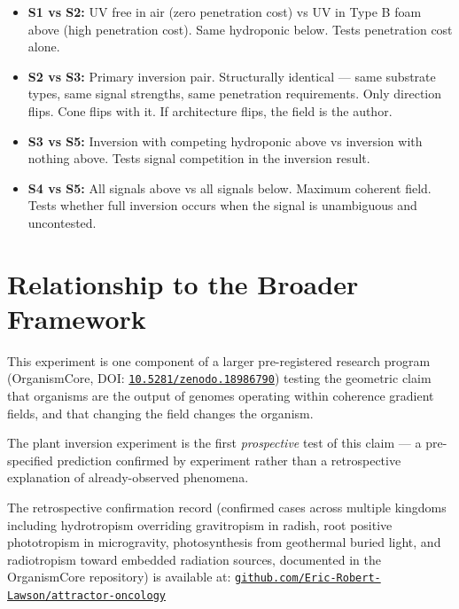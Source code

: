 \documentclass[10pt, a4paper]{article}
\begin{document}
\begin{itemize}[itemsep=0.2em]
  \item \textbf{S1 vs S2:} UV free in air (zero
    penetration cost) vs UV in Type B foam above
    (high penetration cost). Same hydroponic below.
    Tests penetration cost alone.
  \item \textbf{S2 vs S3:} Primary inversion pair.
    Structurally identical --- same substrate types,
    same signal strengths, same penetration requirements.
    Only direction flips. Cone flips with it.
    If architecture flips, the field is the author.
  \item \textbf{S3 vs S5:} Inversion with competing
    hydroponic above vs inversion with nothing above.
    Tests signal competition in the inversion result.
  \item \textbf{S4 vs S5:} All signals above vs all
    signals below. Maximum coherent field.
    Tests whether full inversion occurs when the signal
    is unambiguous and uncontested.
\end{itemize}

\vspace{0.5em}

\section{Relationship to the Broader Framework}

This experiment is one component of a larger
pre-registered research program (OrganismCore,
DOI: \href{https://doi.org/10.5281/zenodo.18986790}
{\texttt{10.5281/zenodo.18986790}}) testing
the geometric claim that organisms are the output
of genomes operating within coherence gradient fields,
and that changing the field changes the organism.

The plant inversion experiment is the first
\textit{prospective} test of this claim ---
a pre-specified prediction confirmed by experiment
rather than a retrospective explanation of
already-observed phenomena.

The retrospective confirmation record
(confirmed cases across multiple kingdoms including
hydrotropism overriding gravitropism in radish,
root positive phototropism in microgravity,
photosynthesis from geothermal buried light,
and radiotropism toward embedded radiation sources,
documented in the OrganismCore repository) is available at:
\href{https://github.com/Eric-Robert-Lawson/attractor-oncology}
{\texttt{github.com/Eric-Robert-Lawson/attractor-oncology}}
\end{document}
